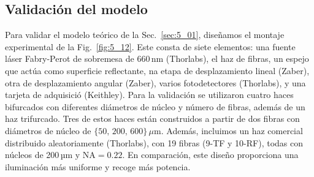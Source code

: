\documentclass[11pt,a4paper]{article}
\begin{document}
\begin{multicols}{2}
\section{Validación del modelo}\label{sec:5_03}
Para validar el modelo teórico de la Sec.~\ref{sec:5_01}, diseñamos el montaje experimental de la Fig.~\ref{fig:5_12}. Este consta de siete elementos: una fuente láser Fabry-Perot de sobremesa de 660\,nm (Thorlabs), el haz de fibras, un espejo que actúa como superficie reflectante, na etapa de desplazamiento lineal (Zaber), otra de desplazamiento angular (Zaber), varios fotodetectores (Thorlabs), y una tarjeta de adquisició (Keithley). Para la validación se utilizaron cuatro haces bifurcados con diferentes diámetros de núcleo y número de fibras, además de un haz trifurcado. Tres de estos haces están construidos a partir de dos fibras con diámetros de núcleo de $\{50,\,200,\,600\}\,\mu\text{m}$. Además, incluimos un haz comercial distribuido aleatoriamente (Thorlabs), con 19 fibras (9-TF y 10-RF), todas con núcleos de 200\,µm y $\mathrm{NA} = 0.22$. En comparación, este diseño proporciona una iluminación más uniforme y recoge más potencia.

\end{multicols}
\end{document}
